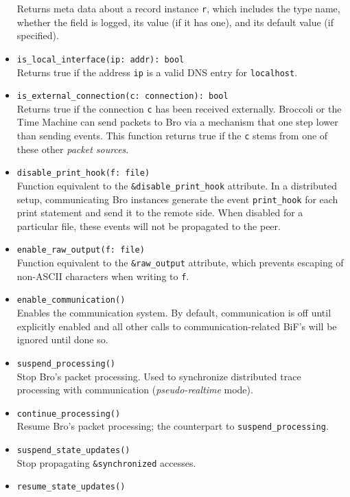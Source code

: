 \documentclass[10pt,landscape]{article}
\begin{document}
\begin{multicols*}{2}
\begin{itemize}
    Returns meta data about a record instance \verb|r|, which includes the
    type name, whether the field is logged, its value (if it has one), and its
    default value (if specified).
  \item \verb|is_local_interface(ip: addr): bool|\\
    Returns true if the address \verb|ip| is a valid DNS entry for
    \texttt{localhost}.
  \item \verb|is_external_connection(c: connection): bool|\\
    Returns true if the connection \verb|c| has been received externally.
    Broccoli or the Time Machine can send packets to Bro via a mechanism that
    one step lower than sending events. This function returns true if the
    \verb|c| stems from one of these other \emph{packet sources}.
  \item \verb|disable_print_hook(f: file)|\\
    Function equivalent to the \verb|&disable_print_hook| attribute. In a
    distributed setup, communicating Bro instances generate the event
    \verb|print_hook| for each print statement and send it to the remote side.
    When disabled for a particular file, these events will not be propagated to
    the peer.
  \item \verb|enable_raw_output(f: file)|\\
    Function equivalent to the \verb|&raw_output| attribute, which prevents
    escaping of non-ASCII characters when writing to \verb|f|.
  \item \verb|enable_communication()|\\
    Enables the communication system. By default, communication is off until
    explicitly enabled and all other calls to communication-related BiF's will
    be ignored until done so.
  \item \verb|suspend_processing()|\\
    Stop Bro's packet processing. Used to synchronize distributed trace
    processing with communication (\emph{pseudo-realtime} mode).
  \item \verb|continue_processing()|\\
    Resume Bro's packet processing; the counterpart to
    \verb|suspend_processing|.
  \item \verb|suspend_state_updates()|\\
    Stop propagating \verb|&synchronized| accesses.
  \item \verb|resume_state_updates()|\\

\end{itemize}
\end{multicols*}
\end{document}
